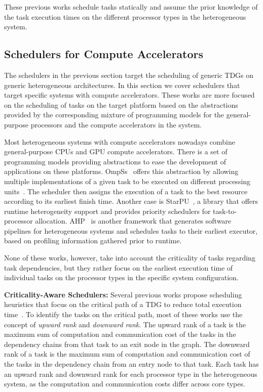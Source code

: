 These previous works schedule tasks statically and assume the prior knowledge of the task execution times on the different processor types in the heterogeneous system.

\subsection{Schedulers for Compute Accelerators}

The schedulers in the previous section target the scheduling of generic TDGs on generic heterogeneous architectures. In this section we cover schedulers that target specific systems with compute accelerators. These works are more focused on the scheduling of tasks on the target platform based on the abstractions provided by the corresponding mixture of programming models for the general-purpose processors and the compute accelerators in the system.

Most heterogeneous systems with compute accelerators nowadays combine general-purpose CPUs and GPU compute accelerators. There is a set of programming models providing abstractions to ease the development of applications on these platforms. OmpSs~\cite{OmpSs_PPL11, OmpSs} offers this abstraction by allowing multiple implementations of a given task to be executed on different processing units~\cite{Judit}. The scheduler then assigns the execution of a task to the best resource according to its earliest finish time. Another case is StarPU~\cite{starpu}, a library that offers runtime heterogeneity support and provides priority schedulers for task-to-processor allocation. AHP~\cite{AHP} is another framework that generates software pipelines for heterogeneous systems and schedules tasks to their earliest executor, based on profiling information gathered prior to runtime.

None of these works, however, take into account the criticality of tasks regarding task dependencies, but they rather focus on the earliest execution time of individual tasks on the processor types in the specific system configuration.
\fi


\textbf{Criticality-Aware Schedulers: }
Several previous works propose scheduling heuristics that focus on the critical path of a TDG to reduce total execution time~\cite{DCPS, LDCP, HEFT, CrPathDup, Moschakis2015}. To identify the tasks on the critical path, most of these works use the concept of \textit{upward rank} and \textit{downward rank}. The upward rank of a task is the maximum sum of computation and communication cost of the tasks in the dependency chains from that task to an exit node in the graph. The downward rank of a task is the maximum sum of computation and communication cost of the tasks in the dependency chain from an entry node to that task. Each task has an upward rank and downward rank for each processor type in the heterogeneous system, as the computation and communication costs differ across core types.

